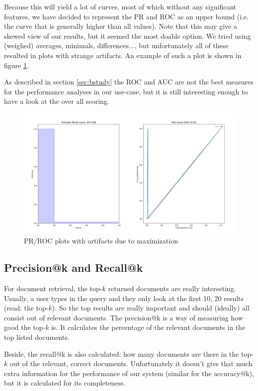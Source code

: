 \documentclass[11pt]{article}
\begin{document}
Because this will yield a lot of curves, most of which without any significant features, we have decided to represent the PR and ROC as an upper bound (i.e. the curve that is generally higher than all values). Note that this may give a skewed view of our results, but it seemed the most doable option. We tried using (weighed) averages, minimals, differences..., but unfortunately all of these resulted in plots with strange artifacts. An example of such a plot is shown in figure \ref{fig:artifact}.

As described in section \ref{sec:bstudy} the ROC and AUC are not the best measures for the performance analyses in our use-case, but it is still interesting enough to have a look at the over all scoring.

\begin{figure}[htp]
	\centering
	\includegraphics[width=\textwidth]{images/artifact}
	\caption{PR/ROC plots with artifacts due to maximization}
	\label{fig:artifact}
\end{figure}

\subsection{\textsf{Precision@k} and \textsf{Recall@k}}
For document retrieval, the top-$k$ returned documents are really interesting. Usually, a user types in the query and they only look at the first 10, 20 results (read: the top-$k$). So the top results are really important and should (ideally) all consist out of relevant documents. The \textsf{precision@k} is a way of measuring how good the top-$k$ is. It calculates the percentage of the relevant documents in the top listed documents.

Beside, the \textsf{recall@k} is also calculated: how many documents are there in the top-$k$ out of the relevant, correct documents. Unfortunately it doesn't give that much extra information for the performance of our system (similar for the \textsf{accuracy@k}), but it is calculated for its completeness. 
\end{document}
